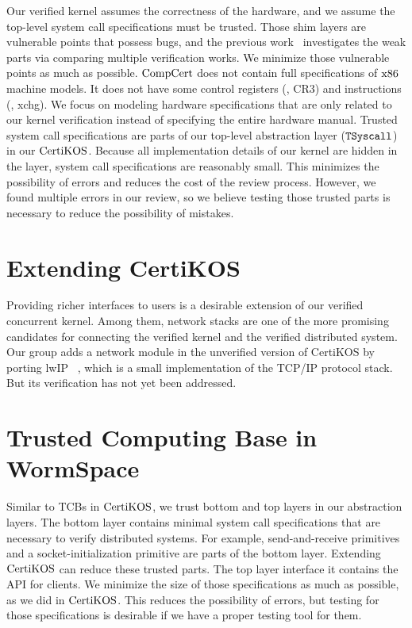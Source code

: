 Our verified kernel assumes the correctness of the hardware, and we assume the top-level system call specifications must be trusted. 
Those shim layers are vulnerable points that possess bugs, and the previous work~\cite{shimlayer} investigates the weak parts via comparing 
multiple verification works. We minimize those vulnerable points as much as possible. 
$\mathrm{CompCert}$ does not contain full specifications of $\mathrm{x86}$ machine models.
It does not have some control registers (\eg, CR3) and 
instructions (\eg, xchg).
We focus on modeling hardware specifications that are only related to our kernel verification instead of specifying the entire hardware manual. 
Trusted system call specifications are parts of our top-level abstraction layer (${{\mathrm{\texttt{TSyscall}}}}$) in our $\mathrm{CertiKOS}$.
Because all implementation details of our kernel are hidden in the layer, system call specifications are reasonably small. 
This minimizes the possibility of errors and reduces the cost of the review process. However, we found multiple errors 
in our review, so we believe testing those trusted parts is necessary to reduce the possibility of mistakes.

\section{Extending CertiKOS}

Providing richer interfaces to users is a desirable extension of our verified concurrent kernel. Among them, network stacks are 
one of the more promising candidates for connecting the verified kernel and the verified distributed system. 
Our group adds a network module in the unverified 
version of CertiKOS by porting lwIP ~\cite{lwip},  which is a small implementation of the TCP/IP protocol stack. 
But its verification has not yet been addressed.

\section{Trusted Computing Base in WormSpace}

Similar to TCBs in $\mathrm{CertiKOS}$, we trust bottom and top layers in our abstraction layers.
 The bottom layer contains minimal system call specifications that are necessary to verify distributed systems. 
 For example, send-and-receive primitives and a socket-initialization primitive are parts of the bottom layer. 
Extending $\mathrm{CertiKOS}$ can reduce these trusted parts. 
The top layer interface it contains the API for clients. 
We minimize the size of those specifications as much as possible, as we did in   $\mathrm{CertiKOS}$.
This reduces the possibility of errors, but testing for those specifications is desirable if we have a proper testing tool for them.

